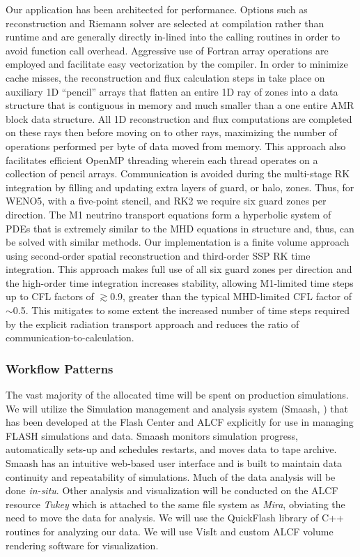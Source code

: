 Our \sparkmone application has been architected for performance.
Options such as reconstruction and Riemann solver are selected at compilation rather than runtime and are generally directly in-lined into the  calling routines in order to avoid function call overhead.
Aggressive use of Fortran array operations are employed and facilitate easy vectorization by the compiler.
In order to minimize cache misses, the reconstruction and flux calculation steps in \spark take place on auxiliary 1D ``pencil'' arrays that flatten an entire 1D ray of zones into a data structure that is contiguous in memory and much smaller than a one entire AMR block data structure.
All 1D reconstruction and flux computations are completed on these rays then before moving on to other rays, maximizing the number of operations performed per byte of data moved from memory.
This approach also facilitates efficient OpenMP threading wherein each thread operates on a collection of pencil arrays.
Communication is avoided during the multi-stage RK integration by filling and updating extra layers of guard, or halo, zones.
Thus, for WENO5, with a five-point stencil, and RK2 we require six guard zones per direction.
The M1 neutrino transport equations form a hyperbolic system of PDEs that is extremely similar to the MHD equations in structure and, thus, can be solved with similar methods.
Our implementation is a finite volume approach using second-order spatial reconstruction and third-order SSP RK time integration.
This approach makes full use of all six guard zones per direction and the high-order time integration increases stability, allowing M1-limited time steps up to CFL factors of $\gtrsim$0.9, greater than the typical MHD-limited CFL factor of $\sim$0.5.
This mitigates to some extent the increased number of time steps required by the explicit radiation transport approach and reduces the ratio of communication-to-calculation.


\subsubsection{Workflow Patterns}

The vast majority of the allocated time will be spent on production
simulations. We will utilize the Simulation management and analysis
system (Smaash, \citep{Hudson:2011}) that has been developed at the
Flash Center and ALCF explicitly for use in managing FLASH simulations
and data. Smaash monitors simulation progress, automatically sets-up
and schedules restarts, and moves data to tape archive. Smaash has an
intuitive web-based user interface and is built to maintain data
continuity and repeatability of simulations. Much of the data analysis
will be done {\it in-situ}.  Other analysis and visualization will be
conducted on the ALCF resource {\it Tukey} which is attached to the
same file system as {\it Mira}, obviating the need to move the data for
analysis.  We will use the QuickFlash library of C++ routines for
analyzing our data.  We will use VisIt and custom ALCF volume
rendering software for visualization.

